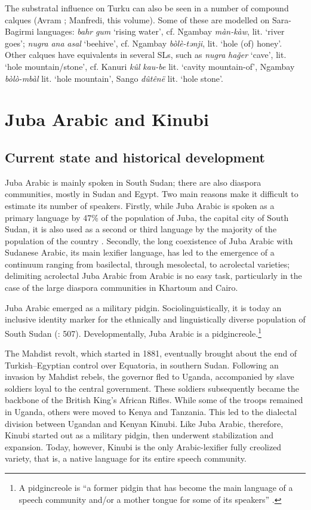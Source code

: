 \documentclass[output=paper]{langsci/langscibook}
\begin{document}
  The substratal influence on Turku can also be seen in a number of compound calques (Avram \citeyear{Avram2019}; Manfredi, this volume). Some of these are modelled on Sara-Bagirmi languages: \textit{bahr} \textit{gum} ‘rising water’, cf. Ngambay \textit{màn-kà}\textit{w}, lit. ‘river goes’; \textit{nugra} \textit{ana} \textit{asal} ‘beehive’, cf. Ngambay \textit{bòlè-tǝnji}, lit. ‘hole (of) honey’. Other calques have equivalents in several SLs, such as \textit{nugra} \textit{haǧer} ‘cave’, lit. ‘hole mountain/stone’, cf. Kanuri \textit{kûl} \textit{kau-be} lit. ‘cavity mountain-of’, Ngambay \textit{bòlò-mbàl} lit. ‘hole mountain’, Sango \textit{dûtênë} lit. ‘hole stone’.


 \section{Juba Arabic and Kinubi}\label{sec:jub}


 \subsection{Current state and historical development}


Juba Arabic is mainly spoken in South Sudan; there are also diaspora communities, mostly in Sudan and Egypt. Two main reasons make it difficult to estimate its number of speakers. Firstly, while Juba Arabic is spoken as a primary language by 47\% of the population of Juba, the capital city of South Sudan, it is also used as a second or third language by the majority of the population of the country \citep[7]{Manfredi2017}. Secondly, the long coexistence of Juba Arabic with Sudanese Arabic, its main lexifier language, has led to the emergence of a continuum ranging from basilectal, through mesolectal, to acrolectal varieties; delimiting acrolectal Juba Arabic from Arabic is no easy task, particularly in the case of the large diaspora communities in Khartoum and Cairo.

  Juba Arabic emerged as a military pidgin. Sociolinguistically, it is today an inclusive identity marker for the ethnically and linguistically diverse population of South Sudan (\citealt{ToscoManfredi2013}: 507). Developmentally, Juba Arabic is a pidgincreole.\footnote{A pidgincreole is “a former pidgin that has become the main language of a speech community and/or a mother tongue for some of its speakers” \citep[131]{Bakker2008}.}

The Mahdist revolt, which started in 1881, eventually brought about the end of Turkish--Egyptian control over Equatoria, in southern Sudan. Following an invasion by Mahdist rebels, the governor fled to Uganda, accompanied by slave soldiers loyal to the central government. These soldiers subsequently became the backbone of the British King’s African Rifles. While some of the troops remained in Uganda, others were moved to Kenya and Tanzania. This led to the dialectal division between Ugandan and Kenyan Kinubi. Like Juba Arabic, therefore, Kinubi started out as a military pidgin, then underwent stabilization and expansion. Today, however, Kinubi is the only Arabic-lexifier fully creolized variety, that is, a native language for its entire speech community.
\end{document}
